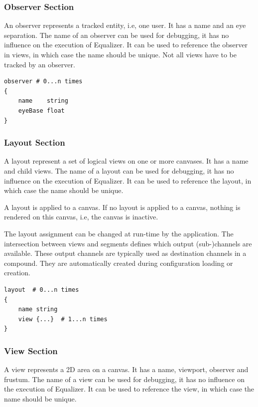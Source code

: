 \documentclass[10pt,a4]{scrartcl}
\begin{document}
\subsubsection{Observer Section}

An observer represents a tracked entity, i.e, one user. It has a name
and an eye separation. The name of an observer can be used for
debugging, it has no influence on the execution of Equalizer. It can be
used to reference the observer in views, in which case the name should
be unique. Not all views have to be tracked by an observer.

{\footnotesize\begin{lstlisting}
observer # 0...n times
{
    name    string
    eyeBase float
}
\end{lstlisting}}

\subsubsection{Layout Section}

A layout represent a set of logical views on one or more canvases. It
has a name and child views. The name of a layout can be used for
debugging, it has no influence on the execution of Equalizer. It can be
used to reference the layout, in which case the name should be unique.

A layout is applied to a canvas. If no layout is applied to a canvas,
nothing is rendered on this canvas, i.e, the canvas is inactive.

The layout assignment can be changed at run-time by the application. The
intersection between views and segments defines which output
(sub-)channels are available. These output channels are typically used
as destination channels in a compound. They are automatically created
during configuration loading or creation.

{\footnotesize\begin{lstlisting}
layout  # 0...n times
{
    name string
    view {...}  # 1...n times
}
\end{lstlisting}}

\subsubsection{View Section}

A view represents a 2D area on a canvas. It has a name, viewport,
observer and frustum. The name of a view can be used for debugging, it
has no influence on the execution of Equalizer. It can be used to
reference the view, in which case the name should be unique.
\end{document}
